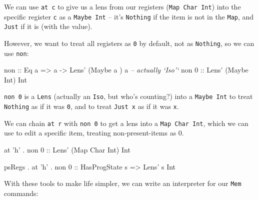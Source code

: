 \documentclass[]{article}
\newenvironment{Shaded}{}{}
\newcommand{\DataTypeTok}[1]{\textcolor[rgb]{0.56,0.13,0.00}{#1}}
\newcommand{\DecValTok}[1]{\textcolor[rgb]{0.25,0.63,0.44}{#1}}
\newcommand{\CharTok}[1]{\textcolor[rgb]{0.25,0.44,0.63}{#1}}
\newcommand{\CommentTok}[1]{\textcolor[rgb]{0.38,0.63,0.69}{\textit{#1}}}
\newcommand{\OtherTok}[1]{\textcolor[rgb]{0.00,0.44,0.13}{#1}}
\newcommand{\FunctionTok}[1]{\textcolor[rgb]{0.02,0.16,0.49}{#1}}
\newcommand{\NormalTok}[1]{#1}
\begin{document}
We can use \texttt{at\ \textquotesingle{}c\textquotesingle{}} to give us a lens
from our registers (\texttt{Map\ Char\ Int}) into the specific register
\texttt{\textquotesingle{}c\textquotesingle{}} as a \texttt{Maybe\ Int} -- it's
\texttt{Nothing} if the item is not in the \texttt{Map}, and \texttt{Just} if it
is (with the value).

However, we want to treat all registers as \texttt{0} by default, not as
\texttt{Nothing}, so we can use \texttt{non}:

\begin{Shaded}
\begin{Highlighting}[]
\OtherTok{non ::} \DataTypeTok{Eq}\NormalTok{ a }\OtherTok{=>}\NormalTok{ a }\OtherTok{->} \DataTypeTok{Lens'}\NormalTok{ (}\DataTypeTok{Maybe}\NormalTok{ a  ) a         }\CommentTok{-- actually `Iso'`}
\NormalTok{non }\DecValTok{0}\OtherTok{ ::}            \DataTypeTok{Lens'}\NormalTok{ (}\DataTypeTok{Maybe} \DataTypeTok{Int}\NormalTok{) }\DataTypeTok{Int}
\end{Highlighting}
\end{Shaded}

\texttt{non\ 0} is a \texttt{Lens} (actually an \texttt{Iso}, but who's
counting?) into a \texttt{Maybe\ Int} to treat \texttt{Nothing} as if it was
\texttt{0}, and to treat \texttt{Just\ x} as if it was \texttt{x}.

We can chain \texttt{at\ r} with \texttt{non\ 0} to get a lens into a
\texttt{Map\ Char\ Int}, which we can use to edit a specific item, treating
non-present-items as 0.

\begin{Shaded}
\begin{Highlighting}[]
\NormalTok{         at }\CharTok{'h'} \FunctionTok{.}\NormalTok{ non }\DecValTok{0}\OtherTok{ ::} \DataTypeTok{Lens'}\NormalTok{ (}\DataTypeTok{Map} \DataTypeTok{Char} \DataTypeTok{Int}\NormalTok{) }\DataTypeTok{Int}

\NormalTok{psRegs }\FunctionTok{.}\NormalTok{ at }\CharTok{'h'} \FunctionTok{.}\NormalTok{ non }\DecValTok{0}\OtherTok{ ::} \DataTypeTok{HasProgState}\NormalTok{ s }\OtherTok{=>} \DataTypeTok{Lens'}\NormalTok{ s }\DataTypeTok{Int}
\end{Highlighting}
\end{Shaded}

With these tools to make life simpler, we can write an interpreter for our
\texttt{Mem} commands:
\end{document}
